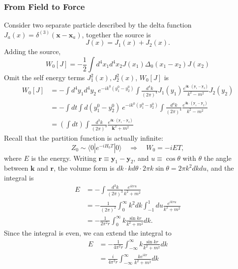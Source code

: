 \subsubsection{From Field to Force}
Consider two separate particle described by the delta function $J_a(x) = \delta^{(3)}(\bm x - \bm x_a)$, together the source is
\begin{equation}
	J(x) = J_1(x) + J_2(x).
\end{equation}
Adding the source,
\begin{equation*}
	W_0[J] = -\frac{1}{2}\int d^4x_1 d^4 x_2 J(x_1) \Delta_0(x_1-x_2) J(x_2)
\end{equation*}
Omit the self energy terms $J_1^2(x), J_2^2(x)$, $W_0[J]$ is
\begin{equation}
\begin{aligned}
	W_0[J] &= -\int d^4 y_1 d^4 y_2\ e^{-ik^0(y_1^0-y_2^0)}\int \frac{d^4 k}{(2\pi)^4} J_1(y_1)\frac{e^{i\bm k\cdot (\bm y_1-\bm y_2)}}{k^2-m^2} J_2(y_2) \\
	&= -\int  dt \int d (y_1^0 - y_2^0) \ e^{-ik^0(y_1^0-y_2^0)}\int \frac{d^4 k}{(2\pi)^4} \frac{e^{i\bm k\cdot (\bm y_1-\bm y_2)}}{k^2-m^2} \\
	&= \left(\int dt \right)\int \frac{d^3 k}{(2\pi)^3} \frac{e^{i\bm k\cdot (\bm y_1-\bm y_2)}}{\bm k^2 + m^2}
\end{aligned}
\end{equation}
Recall that the partition function is actually infinite:
\begin{equation}
	Z_0 \sim \langle 0| e^{-i H_0 T} |0\rangle \quad \Longrightarrow \quad
	W_0 = -i E T,
\end{equation}
where $E$ is the energy.
Writing $\bm r \equiv \bm y_1 - \bm y_2$, and $u \equiv \cos\theta$ with $\theta$ the angle between $\bm k$ and $\bm r$, the volume form is $dk \cdot kd\theta \cdot  2\pi k \sin \theta = 2\pi k^2 dk du$, and the integral is
\begin{equation}
\begin{aligned}
	E &= -\int \frac{d^3 k}{(2\pi)^3} \frac{e^{i k r u}}{k^2 + m^2} \\
	&= - \frac{1}{(2\pi)^2} \int_0^\infty k^2 dk \int_{-1}^1 du \frac{e^{ikru}}{k^2 +m^2} \\
	&= -\frac{1}{2\pi^2 r} \int_0^\infty k  \frac{\sin kr}{k^2 +m^2} dk.
\end{aligned}
\end{equation}
Since the integral is even, we can extend the integral to
\begin{equation}
\begin{aligned}
	E &= -\frac{1}{4\pi^2 r} \int_{-\infty}^\infty k  \frac{\sin kr}{k^2 +m^2} dk \\
	&= \frac{i}{4\pi^2 r} \int_{-\infty}^\infty \frac{k e^{ikr}}{k^2 +m^2} dk
\end{aligned}
\end{equation}
